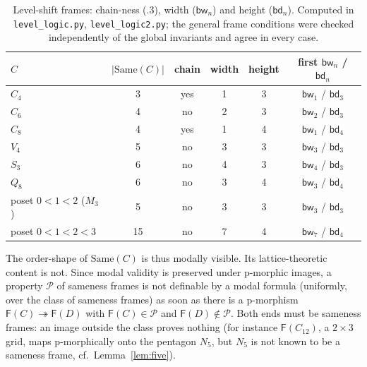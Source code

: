 \documentclass[11pt]{amsart}
\theoremstyle{definition}
\newcommand{\Same}{\mathrm{Same}}
\newcommand{\Fr}{\mathsf{F}}
\newcommand{\bw}{\mathsf{bw}}
\newcommand{\bd}{\mathsf{bd}}
\begin{document}
\begin{table}[ht]
\centering
\begin{tabular}{@{}lccccc@{}}
\toprule
$C$ & $|\Same(C)|$ & chain & width & height & first $\bw_n$ / $\bd_n$ \\
\midrule
$C_4$ & 3 & yes & 1 & 3 & $\bw_1$ / $\bd_3$ \\
$C_6$ & 4 & no & 2 & 3 & $\bw_2$ / $\bd_3$ \\
$C_8$ & 4 & yes & 1 & 4 & $\bw_1$ / $\bd_4$ \\
$V_4$ & 5 & no & 3 & 3 & $\bw_3$ / $\bd_3$ \\
$S_3$ & 6 & no & 4 & 3 & $\bw_4$ / $\bd_3$ \\
$Q_8$ & 6 & no & 3 & 4 & $\bw_3$ / $\bd_4$ \\
poset $0<1<2$ ($M_3$) & 5 & no & 3 & 3 & $\bw_3$ / $\bd_3$ \\
poset $0<1<2<3$ & 15 & no & 7 & 4 & $\bw_7$ / $\bd_4$ \\
\bottomrule
\end{tabular}
\caption{Level-shift frames: chain-ness ($.3$), width ($\bw_n$) and height
($\bd_n$). Computed in \texttt{level\_logic.py}, \texttt{level\_logic2.py};
the general frame conditions were checked independently of the global
invariants and agree in every case.}
\label{tab:frames}
\end{table}

The order-shape of $\Same(C)$ is thus modally visible. Its lattice-theoretic
content is not. Since modal validity is preserved under p-morphic images, a
property $\mathcal P$ of sameness frames is not definable by a modal formula
(uniformly, over the class of sameness frames) as soon as there is a
p-morphism $\Fr(C)\twoheadrightarrow\Fr(D)$ with $\Fr(C)\in\mathcal P$ and
$\Fr(D)\notin\mathcal P$. Both ends must be sameness frames: an image outside
the class proves nothing (for instance $\Fr(C_{12})$, a $2\times3$ grid, maps
p-morphically onto the pentagon $N_5$, but $N_5$ is not known to be a sameness
frame, cf.\ Lemma~\ref{lem:five}).
\end{document}

